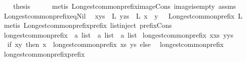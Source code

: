\begin{isabellebody}
\ \ \isamarkupfalse%
\ {\isacharquery}thesis\isanewline
\ \ \ \ \isamarkupfalse%
\ {\isacharparenleft}metis\ Longest{\isacharunderscore}common{\isacharunderscore}prefix{\isacharunderscore}image{\isacharunderscore}Cons\ image{\isacharunderscore}is{\isacharunderscore}empty\ assms{\isacharparenleft}{}{\isacharparenright}{\isacharparenright}\isanewline
{}\isamarkupfalse%
%
\endisatagproof
{\isafoldproof}%
%
\isadelimproof
\isanewline
%
\endisadelimproof
\isanewline
{}\isamarkupfalse%
\ Longest{\isacharunderscore}common{\isacharunderscore}prefix{\isacharunderscore}eq{\isacharunderscore}Nil{\isacharcolon}\isanewline
\ \ {\isachardoublequoteopen}{\isasymlbrakk}x{\isacharhash}ys\ {\isasymin}\ L{\isacharsemicolon}\ y{\isacharhash}zs\ {\isasymin}\ L{\isacharsemicolon}\ x\ {\isasymnoteq}\ y\ {\isasymrbrakk}\ {\isasymLongrightarrow}\ Longest{\isacharunderscore}common{\isacharunderscore}prefix\ L\ {\isacharequal}\ {\isacharbrackleft}{\isacharbrackright}{\isachardoublequoteclose}\isanewline
%
\isadelimproof
%
\endisadelimproof
%
\isatagproof
{}\isamarkupfalse%
\ {\isacharparenleft}metis\ Longest{\isacharunderscore}common{\isacharunderscore}prefix{\isacharunderscore}prefix\ list{\isachardot}inject\ prefix{\isacharunderscore}Cons{\isacharparenright}%
\endisatagproof
{\isafoldproof}%
%
\isadelimproof
\isanewline
%
\endisadelimproof
\isanewline
\isanewline
{}\isamarkupfalse%
\ longest{\isacharunderscore}common{\isacharunderscore}prefix\ {\isacharcolon}{\isacharcolon}\ {\isachardoublequoteopen}{\isacharprime}a\ list\ {\isasymRightarrow}\ {\isacharprime}a\ list\ {\isasymRightarrow}\ {\isacharprime}a\ list{\isachardoublequoteclose}\ \isanewline
{\isachardoublequoteopen}longest{\isacharunderscore}common{\isacharunderscore}prefix\ {\isacharparenleft}x{\isacharhash}xs{\isacharparenright}\ {\isacharparenleft}y{\isacharhash}ys{\isacharparenright}\ {\isacharequal}\isanewline
\ \ {\isacharparenleft}if\ x{\isacharequal}y\ then\ x\ {\isacharhash}\ longest{\isacharunderscore}common{\isacharunderscore}prefix\ xs\ ys\ else\ {\isacharbrackleft}{\isacharbrackright}{\isacharparenright}{\isachardoublequoteclose}\ {\isacharbar}\isanewline
{\isachardoublequoteopen}longest{\isacharunderscore}common{\isacharunderscore}prefix\ {\isacharunderscore}\ {\isacharunderscore}\ {\isacharequal}\ {\isacharbrackleft}{\isacharbrackright}{\isachardoublequoteclose}\isanewline
\isanewline
{}\isamarkupfalse%
\ longest{\isacharunderscore}common{\isacharunderscore}prefix{\isacharunderscore}prefix{}{\isacharcolon}\isanewline

\end{isabellebody}
